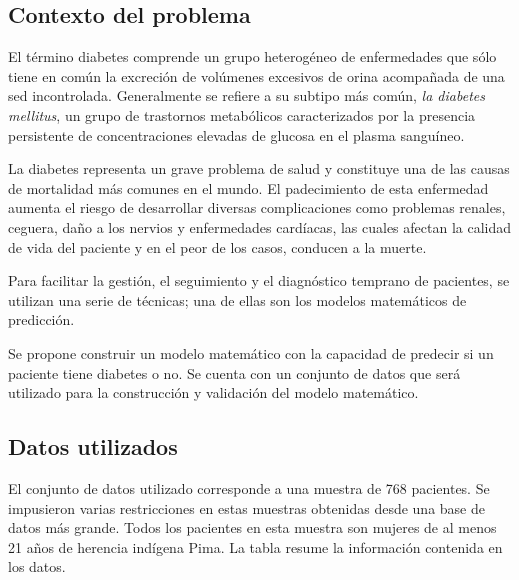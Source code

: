 \documentclass[letter, titlepage, 10pt]{article}
\begin{document}
\subsection{Contexto del problema}
El término diabetes comprende un grupo heterogéneo de enfermedades que sólo tiene en común la excreción de volúmenes excesivos de orina acompañada de una sed incontrolada. Generalmente se refiere a su subtipo más común, \textit{la diabetes mellitus}, un grupo de trastornos metabólicos caracterizados por la presencia persistente de concentraciones elevadas de glucosa en el plasma sanguíneo.

La diabetes representa un grave problema de salud y constituye una de las causas de mortalidad más comunes en el mundo. El padecimiento de esta enfermedad aumenta el riesgo de desarrollar diversas complicaciones como problemas renales, ceguera, daño a los nervios y enfermedades cardíacas, las cuales afectan la calidad de vida del paciente y en el peor de los casos, conducen a la muerte.

Para facilitar la gestión, el seguimiento y el diagnóstico temprano de pacientes, se utilizan una serie de técnicas; una de ellas son los modelos matemáticos de predicción.

Se propone construir un modelo matemático con la capacidad de predecir si un paciente tiene diabetes o no. Se cuenta con un conjunto de datos que será utilizado para la construcción y validación del modelo matemático.

\newpage

\subsection{Datos utilizados}
El conjunto de datos utilizado corresponde a una muestra de 768 pacientes. Se impusieron varias restricciones en estas muestras obtenidas desde una base de datos más grande. Todos los pacientes en esta muestra son mujeres de al menos 21 años de herencia indígena Pima. La tabla resume la información contenida en los datos.
\end{document}
